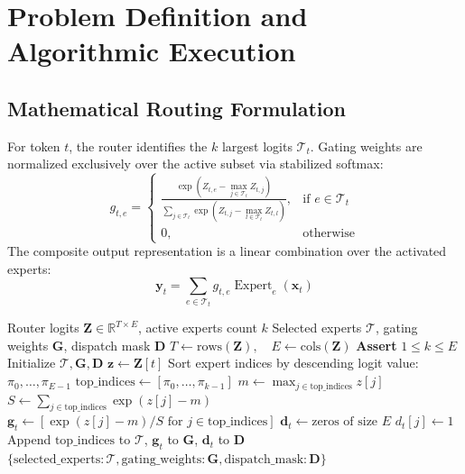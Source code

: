 \documentclass[11pt,a4paper]{article}
\theoremstyle{definition}
\begin{document}
\section{Problem Definition and Algorithmic Execution}

\subsection{Mathematical Routing Formulation}
For token $t$, the router identifies the $k$ largest logits $\mathcal{T}_t$. Gating weights are normalized exclusively over the active subset via stabilized softmax:
\begin{equation}
g_{t, e} = \begin{cases}
\frac{\exp(Z_{t, e} - \max_{j \in \mathcal{T}_t} Z_{t, j})}{\sum_{j \in \mathcal{T}_t} \exp(Z_{t, j} - \max_{l \in \mathcal{T}_t} Z_{t, l})}, & \text{if } e \in \mathcal{T}_t \\
0, & \text{otherwise}
\end{cases}
\end{equation}
The composite output representation is a linear combination over the activated experts:
\begin{equation}
\mathbf{y}_t = \sum_{e \in \mathcal{T}_t} g_{t, e} \operatorname{Expert}_e(\mathbf{x}_t)
\end{equation}

\begin{algorithm}[H]
\caption{MoE Top-$K$ Gating and Dispatch Mask Evaluation}
\label{alg:moe_topk}
\begin{algorithmic}[1]
\Require Router logits $\mathbf{Z} \in \mathbb{R}^{T \times E}$, active experts count $k$
\Ensure Selected experts $\boldsymbol{\mathcal{T}}$, gating weights $\mathbf{G}$, dispatch mask $\mathbf{D}$
\State $T \gets \text{rows}(\mathbf{Z}), \quad E \gets \text{cols}(\mathbf{Z})$
\State \textbf{Assert} $1 \le k \le E$
\State Initialize $\boldsymbol{\mathcal{T}}, \mathbf{G}, \mathbf{D}$
    \State $\mathbf{z} \gets \mathbf{Z}[t]$
    \State Sort expert indices by descending logit value: $\pi_0, \dots, \pi_{E-1}$
    \State $\text{top\_indices} \gets [\pi_0, \dots, \pi_{k-1}]$
    \State $m \gets \max_{j \in \text{top\_indices}} z[j]$
    \State $S \gets \sum_{j \in \text{top\_indices}} \exp(z[j] - m)$
    \State $\mathbf{g}_t \gets [\exp(z[j] - m) / S \text{ for } j \in \text{top\_indices}]$
    \State $\mathbf{d}_t \gets \text{zeros of size } E$
        \State $d_t[j] \gets 1$
    \EndFor
    \State Append $\text{top\_indices}$ to $\boldsymbol{\mathcal{T}}$, $\mathbf{g}_t$ to $\mathbf{G}$, $\mathbf{d}_t$ to $\mathbf{D}$
\EndFor
\State \Return $\{\text{selected\_experts}: \boldsymbol{\mathcal{T}}, \text{gating\_weights}: \mathbf{G}, \text{dispatch\_mask}: \mathbf{D}\}$
\end{algorithmic}
\end{algorithm}
\end{document}
